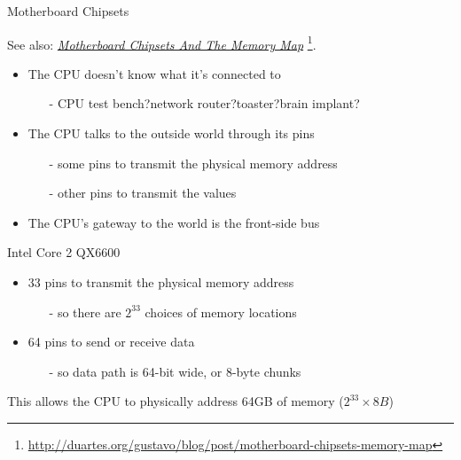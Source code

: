 \begin{frame}
  \begin{center}
  \end{center}
\end{frame}

\begin{frame}{Motherboard Chipsets}
  \begin{center}
  \end{center}
\end{frame}

See also:
\href{http://duartes.org/gustavo/blog/post/motherboard-chipsets-memory-map}{\emph{Motherboard
    Chipsets And The Memory Map}}
\footnote{\url{http://duartes.org/gustavo/blog/post/motherboard-chipsets-memory-map}}.

\begin{frame}
  \begin{itemize}
  \item The CPU doesn't know what it's connected to
    \begin{itemize}
    \item[-] CPU test bench?\quad{}network router?\quad{}toaster?\quad{}brain implant?
    \end{itemize}
  \item The CPU talks to the outside world through its pins
    \begin{itemize}
    \item[-] some pins to transmit the physical memory address
    \item[-] other pins to transmit the values
    \end{itemize}
  \item The CPU's gateway to the world is the \alert{front-side bus}
  \end{itemize}
  \begin{block}{Intel Core 2 QX6600}
    \begin{itemize}
    \item 33 pins to transmit the physical memory address
      \begin{itemize}
      \item[-] so there are $2^{33}$ choices of memory locations
      \end{itemize}
    \item 64 pins to send or receive data
      \begin{itemize}
      \item[-] so data path is 64-bit wide, or 8-byte chunks
      \end{itemize}
    \end{itemize}
    This allows the CPU to physically address 64GB of memory ($2^{33}\times{}8B$)    
  \end{block}
\end{frame}

